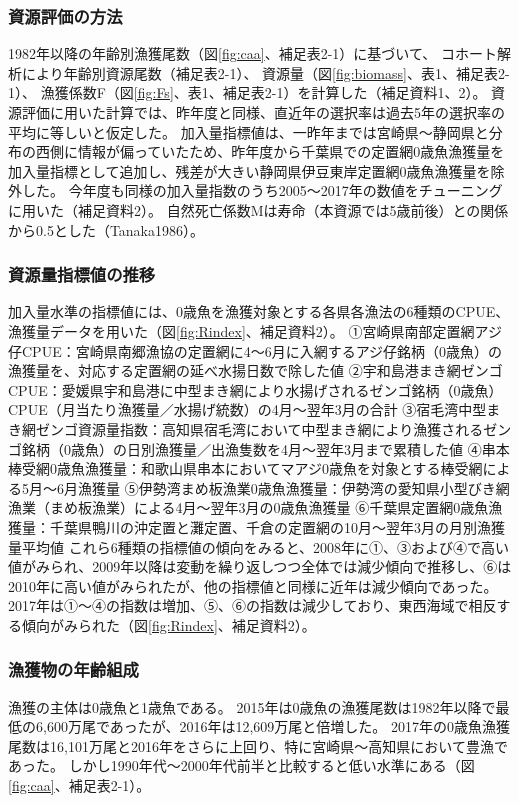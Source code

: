 \subsubsection{資源評価の方法}
1982年以降の年齢別漁獲尾数（図\ref{fig:caa}、補足表2-1）に基づいて、
コホート解析により年齢別資源尾数（補足表2-1）、
資源量（図\ref{fig:biomass}、表1、補足表2-1）、
漁獲係数F（図\ref{fig:Fs}、表1、補足表2-1）を計算した（補足資料1、2）。
資源評価に用いた計算では、昨年度と同様、直近年の選択率は過去5年の選択率の平均に等しいと仮定した。
加入量指標値は、一昨年までは宮崎県～静岡県と分布の西側に情報が偏っていたため、昨年度から千葉県での定置網0歳魚漁獲量を加入量指標として追加し、残差が大きい静岡県伊豆東岸定置網0歳魚漁獲量を除外した。
今年度も同様の加入量指数のうち2005～2017年の数値をチューニングに用いた（補足資料2）。
自然死亡係数Mは寿命（本資源では5歳前後）との関係から0.5とした（Tanaka1986）。

\subsubsection{資源量指標値の推移}
加入量水準の指標値には、0歳魚を漁獲対象とする各県各漁法の6種類のCPUE、漁獲量データを用いた（図\ref{fig:Rindex}、{補足資料2}）。
①宮崎県南部定置網アジ仔CPUE：宮崎県南郷漁協の定置網に4～6月に入網するアジ仔銘柄（0歳魚）の漁獲量を、対応する定置網の延べ水揚日数で除した値
②宇和島港まき網ゼンゴCPUE：愛媛県宇和島港に中型まき網により水揚げされるゼンゴ銘柄（0歳魚）CPUE（月当たり漁獲量／水揚げ統数）の4月～翌年3月の合計
③宿毛湾中型まき網ゼンゴ資源量指数：高知県宿毛湾において中型まき網により漁獲されるゼンゴ銘柄（0歳魚）の日別漁獲量／出漁隻数を4月～翌年3月まで累積した値
④串本棒受網0歳魚漁獲量：和歌山県串本においてマアジ0歳魚を対象とする棒受網による5月～6月漁獲量
⑤伊勢湾まめ板漁業0歳魚漁獲量：伊勢湾の愛知県小型びき網漁業（まめ板漁業）による4月～翌年3月の0歳魚漁獲量
⑥千葉県定置網0歳魚漁獲量：千葉県鴨川の沖定置と灘定置、千倉の定置網の10月～翌年3月の月別漁獲量平均値
これら6種類の指標値の傾向をみると、2008年に①、③および④で高い値がみられ、2009年以降は変動を繰り返しつつ全体では減少傾向で推移し、⑥は2010年に高い値がみられたが、他の指標値と同様に近年は減少傾向であった。
2017年は①～④の指数は増加、⑤、⑥の指数は減少しており、東西海域で相反する傾向がみられた（図\ref{fig:Rindex}、{補足資料2}）。

\subsubsection{漁獲物の年齢組成}
漁獲の主体は0歳魚と1歳魚である。
2015年は0歳魚の漁獲尾数は1982年以降で最低の6,600万尾であったが、2016年は12,609万尾と倍増した。
2017年の0歳魚漁獲尾数は16,101万尾と2016年をさらに上回り、特に宮崎県～高知県において豊漁であった。
しかし1990年代～2000年代前半と比較すると低い水準にある（図\ref{fig:caa}、補足表2-1）。

